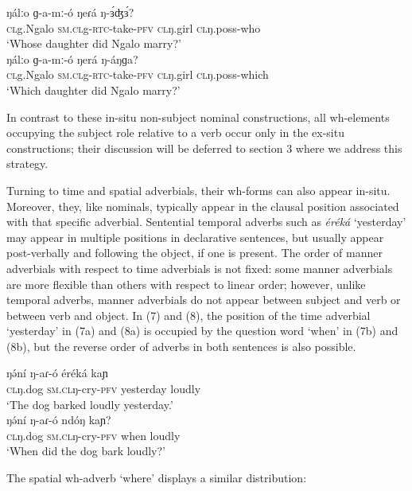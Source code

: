 \ea

\ea \gll	ŋálːo	ɡ-a-mː-ó	ŋeɾá	ŋ-ɜ́ʤɜ́?\\
		\textsc{cl}g.Ngalo	\textsc{sm.cl}g-\textsc{rtc}-take-\textsc{pfv}	\textsc{cl}ŋ.girl	\textsc{cl}ŋ.poss-who\\
\trans		‘Whose daughter did Ngalo marry?’\\
\ex	\gll ŋálːo	ɡ-a-mː-ó	ŋerá	ŋ-áŋɡa?\\
		\textsc{cl}g.Ngalo 	\textsc{sm.cl}g-\textsc{rtc}-take-\textsc{pfv}	\textsc{cl}ŋ.girl	\textsc{cl}ŋ.poss-which\\
\trans		‘Which daughter did Ngalo marry?’\\
\z
\z

In contrast to these in-situ non-subject nominal constructions, all wh-elements occupying the subject role relative to a verb occur only in the ex-situ constructions; their discussion will be deferred to section 3 where we address this strategy.
	
Turning to time and spatial adverbials, their wh-forms can also appear in-situ.  Moreover, they, like nominals, typically appear in the clausal position associated with that specific adverbial. Sentential temporal adverbs such as \textit{éréká} ‘yesterday’ may appear in multiple positions in declarative sentences, but usually appear post-verbally and following the object, if one is present. The order of manner adverbials with respect to time adverbials is not fixed: some manner adverbials are more flexible than others with respect to linear order; however, unlike temporal adverbs, manner adverbials do not appear between subject and verb or between verb and object. In (7) and (8), the position of the time adverbial ‘yesterday’ in (7a) and (8a) is occupied by the question word ‘when’ in (7b) and (8b), but the reverse order of adverbs in both sentences is also possible. 

\ea
\ea \gll	ŋə́ní	ŋ-aɾ-ó 	éréká	kaɲ\\
		\textsc{cl}ŋ.dog	\textsc{sm.cl}ŋ-cry-\textsc{pfv}	yesterday	loudly\\
\trans		‘The dog barked loudly yesterday.’\\
\ex \gll	ŋə́ní	ŋ-aɾ-ó	ndóŋ	kaɲ?\\
		\textsc{cl}ŋ.dog	\textsc{sm.cl}ŋ-cry-\textsc{pfv}	when	loudly\\
\trans		‘When did the dog bark loudly?’\\
\z
\z

The spatial wh-adverb ‘where’ displays a similar distribution:

